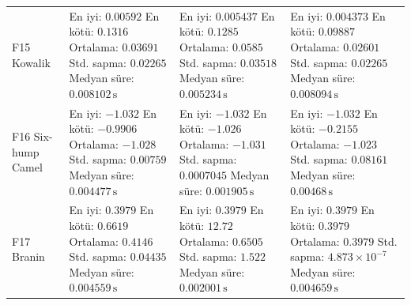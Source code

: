\begin{longtable}{@{}p{2.25cm}p{4.25cm}p{4.25cm}p{4.25cm}@{}}
F15 Kowalik & \makecell[l]{En iyi: $0.00592$\\ En kötü: $0.1316$\\ Ortalama: $0.03691$\\ Std. sapma: $0.02265$\\ Medyan süre: $0.008102\,\mathrm{s}$} & \makecell[l]{En iyi: $0.005437$\\ En kötü: $0.1285$\\ Ortalama: $0.0585$\\ Std. sapma: $0.03518$\\ Medyan süre: $0.005234\,\mathrm{s}$} & \makecell[l]{En iyi: $0.004373$\\ En kötü: $0.09887$\\ Ortalama: $0.02601$\\ Std. sapma: $0.02265$\\ Medyan süre: $0.008094\,\mathrm{s}$} \\
F16 Six-hump Camel & \makecell[l]{En iyi: $-1.032$\\ En kötü: $-0.9906$\\ Ortalama: $-1.028$\\ Std. sapma: $0.00759$\\ Medyan süre: $0.004477\,\mathrm{s}$} & \makecell[l]{En iyi: $-1.032$\\ En kötü: $-1.026$\\ Ortalama: $-1.031$\\ Std. sapma: $0.0007045$\\ Medyan süre: $0.001905\,\mathrm{s}$} & \makecell[l]{En iyi: $-1.032$\\ En kötü: $-0.2155$\\ Ortalama: $-1.023$\\ Std. sapma: $0.08161$\\ Medyan süre: $0.00468\,\mathrm{s}$} \\
F17 Branin & \makecell[l]{En iyi: $0.3979$\\ En kötü: $0.6619$\\ Ortalama: $0.4146$\\ Std. sapma: $0.04435$\\ Medyan süre: $0.004559\,\mathrm{s}$} & \makecell[l]{En iyi: $0.3979$\\ En kötü: $12.72$\\ Ortalama: $0.6505$\\ Std. sapma: $1.522$\\ Medyan süre: $0.002001\,\mathrm{s}$} & \makecell[l]{En iyi: $0.3979$\\ En kötü: $0.3979$\\ Ortalama: $0.3979$\\ Std. sapma: $4.873\times 10^{-7}$\\ Medyan süre: $0.004659\,\mathrm{s}$} \\

\end{longtable}
